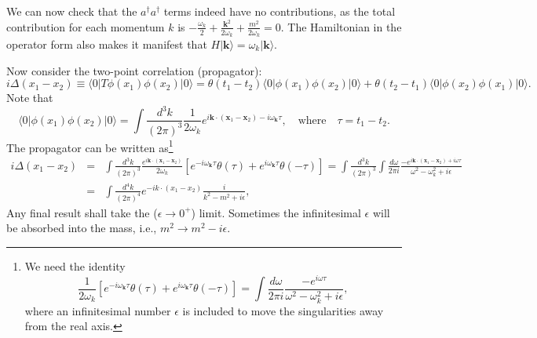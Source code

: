 \documentclass[aps,prb,superscriptaddress,nofootinbib]{revtex4}
\begin{document}
We can now check that the $a^\dagger a^\dagger$ terms indeed have no contributions, as the total contribution for each momentum $k$ is $-\frac{\omega_k}{2} + \frac{\bm k^2}{2\omega_k} + \frac{m^2}{2\omega_k} = 0$.
The Hamiltonian in the operator form also makes it manifest that $H |\bm k\rangle = \omega_k |\bm k\rangle$.

Now consider the two-point correlation (propagator):
\begin{equation}
	i\Delta(x_1-x_2) \equiv \langle 0|T \phi(x_1) \phi(x_2) |0\rangle 
	= \theta(t_1-t_2) \langle 0|\phi(x_1) \phi(x_2) |0\rangle 
	+ \theta(t_2-t_1) \langle 0|\phi(x_2) \phi(x_1) |0\rangle.
\end{equation}
Note that
\begin{equation}
	\langle 0|\phi(x_1) \phi(x_2) |0\rangle
	= \int\frac{d^{3} k}{(2\pi)^{3}}\frac{1}{2\omega_k} e^{i\bm k\cdot (\bm x_1-\bm x_2)-i\omega_{\bm k}\tau},
	\quad\text{where}\quad
	\tau =t_1-t_2.
\end{equation}
The propagator can be written as\footnote{We need the identity
\begin{equation*}
	\frac{1}{2\omega_k} \left[e^{-i\omega_{\bm k}\tau}\theta(\tau)+e^{i\omega_{\bm k}\tau}\theta(-\tau)\right] 
	= \int \frac{d\omega}{2\pi i} \frac{-e^{i\omega\tau}}{\omega^2-\omega_k^2+i\epsilon},
\end{equation*}
where an infinitesimal number $\epsilon$ is included to move the singularities away from the real axis.}
\begin{eqnarray}
	i\Delta(x_1-x_2) 
	&=& \int\frac{d^{3} k}{(2\pi)^{3}}\frac{e^{i\bm k\cdot (\bm x_1-\bm x_2)}}{2\omega_k} \left[e^{-i\omega_{\bm k}\tau}\theta(\tau)+e^{i\omega_{\bm k}\tau}\theta(-\tau)\right] 
	= \int\frac{d^{3} k}{(2\pi)^{3}} \int \frac{d\omega}{2\pi i}\frac{-e^{i\bm k\cdot (\bm x_1-\bm x_2)+i\omega\tau}}{\omega^2-\omega_k^2+i\epsilon} \nonumber\\
	&=& \int\frac{d^{4} k}{(2\pi)^{4}} e^{-i k\cdot (x_1-x_2)}\frac{i}{k^2-m^2+i\epsilon},
\end{eqnarray}
Any final result shall take the ($\epsilon \rightarrow 0^+$) limit.
Sometimes the infinitesimal $\epsilon$ will be absorbed into the mass, i.e., $m^2 \rightarrow m^2-i\epsilon$.
\end{document}
